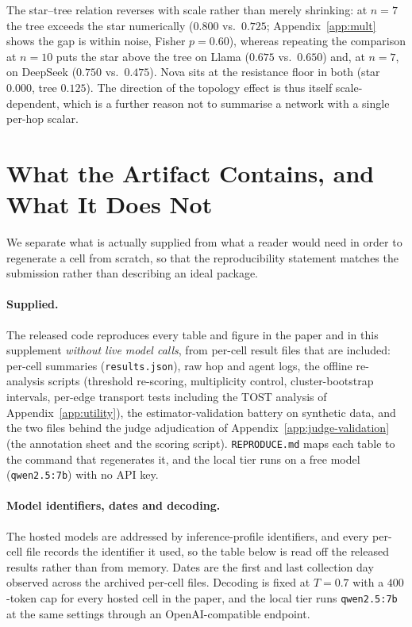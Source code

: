 \documentclass[sigconf,anonymous]{aamas}
\begin{document}
The star--tree relation reverses with scale rather than merely shrinking: at
$n = 7$ the tree exceeds the star numerically ($0.800$ vs.\ $0.725$;
Appendix~\ref{app:mult} shows the gap is within noise, Fisher $p = 0.60$),
whereas repeating the comparison at $n = 10$ puts the star above the tree on
Llama ($0.675$ vs.\ $0.650$) and, at $n = 7$, on DeepSeek ($0.750$ vs.\ $0.475$).
Nova sits at the resistance floor in both (star $0.000$, tree $0.125$). The
direction of the topology effect is thus itself scale-dependent, which is a
further reason not to summarise a network with a single per-hop scalar.

\section{What the Artifact Contains, and What It Does Not}
\label{app:repro}

We separate what is actually supplied from what a reader would need in order to
regenerate a cell from scratch, so that the reproducibility statement matches the
submission rather than describing an ideal package.

\paragraph{Supplied.} The released code reproduces every table and figure in the paper
and in this supplement \emph{without live model calls}, from per-cell result files that
are included: per-cell summaries (\texttt{results.json}), raw hop and agent logs,
the offline re-analysis scripts (threshold re-scoring, multiplicity control,
cluster-bootstrap intervals, per-edge transport tests including the TOST analysis of
Appendix~\ref{app:utility}), the estimator-validation battery on synthetic data, and
the two files behind the judge adjudication of Appendix~\ref{app:judge-validation}
(the annotation sheet and the scoring script). \texttt{REPRODUCE.md} maps each table to
the command that regenerates it, and the local tier runs on a free model
(\texttt{qwen2.5:7b}) with no API key.

\paragraph{Model identifiers, dates and decoding.} The hosted models are addressed by
inference-profile identifiers, and every per-cell file records the identifier it used,
so the table below is read off the released results rather than from memory. Dates are
the first and last collection day observed across the archived per-cell files. Decoding
is fixed at $T = 0.7$ with a $400$-token cap for every hosted cell in the paper, and the
local tier runs \texttt{qwen2.5:7b} at the same settings through an
OpenAI-compatible endpoint.
\end{document}
